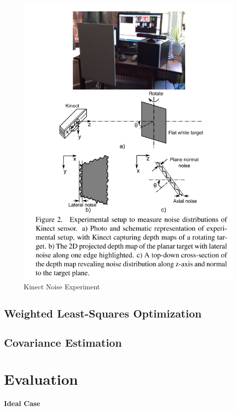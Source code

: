 \documentclass[a4paper]{report}
\numberwithin{figure}{section}
\begin{document}
\begin{figure}[H]
	\centering
  \includegraphics[width=0.7\linewidth,natwidth=640,natheight=640]
  {fig/ref_imgs/kinect_noise_experiment.png}
  \caption{Kinect Noise Experiment}
	\label{fig:kinect_noise_experiment}
\end{figure}



\section{Weighted Least-Squares Optimization} \label{sc_weighted_lsq}

\section{Covariance Estimation} \label{sc_covariance_estim}

\chapter{Evaluation} \label{cp_evaluation}

\subsubsection{Ideal Case} \label{sb_sb_sc_ideal_case}
\end{document}
